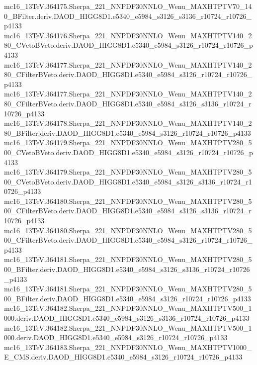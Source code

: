 \begin{footnotesize}
mc16\_13TeV.364175.Sherpa\_221\_NNPDF30NNLO\_Wenu\_MAXHTPTV70\_140\_BFilter.deriv.DAOD\_HIGG8D1.e5340\_e5984\_s3126\_s3136\_r10724\_r10726\_p4133 \\
mc16\_13TeV.364176.Sherpa\_221\_NNPDF30NNLO\_Wenu\_MAXHTPTV140\_280\_CVetoBVeto.deriv.DAOD\_HIGG8D1.e5340\_e5984\_s3126\_r10724\_r10726\_p4133 \\
mc16\_13TeV.364177.Sherpa\_221\_NNPDF30NNLO\_Wenu\_MAXHTPTV140\_280\_CFilterBVeto.deriv.DAOD\_HIGG8D1.e5340\_e5984\_s3126\_r10724\_r10726\_p4133 \\
mc16\_13TeV.364177.Sherpa\_221\_NNPDF30NNLO\_Wenu\_MAXHTPTV140\_280\_CFilterBVeto.deriv.DAOD\_HIGG8D1.e5340\_e5984\_s3126\_s3136\_r10724\_r10726\_p4133 \\
mc16\_13TeV.364178.Sherpa\_221\_NNPDF30NNLO\_Wenu\_MAXHTPTV140\_280\_BFilter.deriv.DAOD\_HIGG8D1.e5340\_e5984\_s3126\_r10724\_r10726\_p4133 \\
mc16\_13TeV.364179.Sherpa\_221\_NNPDF30NNLO\_Wenu\_MAXHTPTV280\_500\_CVetoBVeto.deriv.DAOD\_HIGG8D1.e5340\_e5984\_s3126\_r10724\_r10726\_p4133 \\
mc16\_13TeV.364179.Sherpa\_221\_NNPDF30NNLO\_Wenu\_MAXHTPTV280\_500\_CVetoBVeto.deriv.DAOD\_HIGG8D1.e5340\_e5984\_s3126\_s3136\_r10724\_r10726\_p4133 \\
mc16\_13TeV.364180.Sherpa\_221\_NNPDF30NNLO\_Wenu\_MAXHTPTV280\_500\_CFilterBVeto.deriv.DAOD\_HIGG8D1.e5340\_e5984\_s3126\_s3136\_r10724\_r10726\_p4133 \\
mc16\_13TeV.364180.Sherpa\_221\_NNPDF30NNLO\_Wenu\_MAXHTPTV280\_500\_CFilterBVeto.deriv.DAOD\_HIGG8D1.e5340\_e5984\_s3126\_r10724\_r10726\_p4133 \\
mc16\_13TeV.364181.Sherpa\_221\_NNPDF30NNLO\_Wenu\_MAXHTPTV280\_500\_BFilter.deriv.DAOD\_HIGG8D1.e5340\_e5984\_s3126\_s3136\_r10724\_r10726\_p4133 \\
mc16\_13TeV.364181.Sherpa\_221\_NNPDF30NNLO\_Wenu\_MAXHTPTV280\_500\_BFilter.deriv.DAOD\_HIGG8D1.e5340\_e5984\_s3126\_r10724\_r10726\_p4133 \\
mc16\_13TeV.364182.Sherpa\_221\_NNPDF30NNLO\_Wenu\_MAXHTPTV500\_1000.deriv.DAOD\_HIGG8D1.e5340\_e5984\_s3126\_s3136\_r10724\_r10726\_p4133 \\
mc16\_13TeV.364182.Sherpa\_221\_NNPDF30NNLO\_Wenu\_MAXHTPTV500\_1000.deriv.DAOD\_HIGG8D1.e5340\_e5984\_s3126\_r10724\_r10726\_p4133 \\
mc16\_13TeV.364183.Sherpa\_221\_NNPDF30NNLO\_Wenu\_MAXHTPTV1000\_E\_CMS.deriv.DAOD\_HIGG8D1.e5340\_e5984\_s3126\_r10724\_r10726\_p4133 \\

\end{footnotesize}
